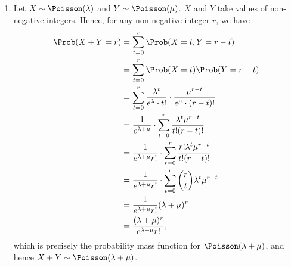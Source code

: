 \Question{\currfilebase}

\begin{enumerate}
    \item Let \(X \sim \Poisson(\lambda)\) and \(Y \sim \Poisson(\mu)\). \(X\) and \(Y\) take values of non-negative integers. Hence, for any non-negative integer \(r\), we have
          \begin{align*}
              \Prob(X + Y = r) & = \sum_{t = 0}^{r} \Prob(X = t, Y = r - t)                                                             \\
                               & = \sum_{t = 0}^{r} \Prob(X = t) \Prob(Y = r - t)                                                       \\
                               & = \sum_{t = 0}^{r} \frac{\lambda^t}{e^\lambda \cdot t!} \cdot \frac{\mu^{r - t}}{e^\mu \cdot (r - t)!} \\
                               & = \frac{1}{e^{\lambda + \mu}} \cdot \sum_{t = 0}^{r} \frac{\lambda^t \mu^{r - t}}{t! (r - t)!}         \\
                               & = \frac{1}{e^{\lambda + \mu} r!} \cdot \sum_{t = 0}^{r} \frac{r! \lambda^t \mu^{r - t}}{t! (r - t)!}   \\
                               & = \frac{1}{e^{\lambda + \mu} r!} \cdot \sum_{t = 0}^{r} \binom{r}{t} \lambda^t \mu^{r - t}             \\
                               & = \frac{1}{e^{\lambda + \mu} r!} (\lambda + \mu)^r                                                     \\
                               & = \frac{(\lambda + \mu)^r}{e^{\lambda + \mu} r!},
          \end{align*}
          which is precisely the probability mass function for \(\Poisson(\lambda + \mu)\), and hence \(X + Y \sim \Poisson(\lambda + \mu)\).


\end{enumerate}
